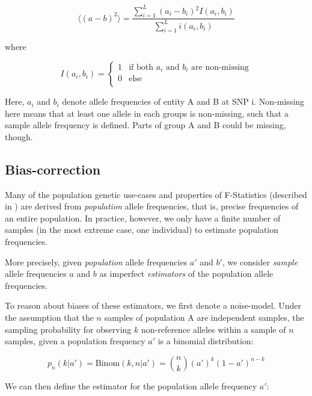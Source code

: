 \documentclass{article}
\begin{document}
\begin{equation}
\langle(a-b)^2\rangle=\frac{\sum _{i=1}^L \left(a_i-b_i\right){}^2 I\left(a_i,b_i\right)}{\sum _{i=1}^L i\left(a_i,b_i\right)}
\end{equation}

where

\begin{equation}
I\left(a_i,b_i\right)=
\begin{cases}
    1 & \text{if both $a_i$ and $b_i$ are non-missing} \\
    0 & \text{else} \\
\end{cases}
\end{equation}

Here, \(a_i\) and \(b_i\) denote allele frequencies of entity A and B at SNP i. Non-missing here means that at least one allele in each groups is non-missing, such that a sample allele frequency is defined. Parts of group A and B could be missing, though.

\subsection{Bias-correction}

Many of the population genetic use-cases and properties of F-Statistics (described in \cite{Patterson2012-yq}) are derived from \textit{population} allele frequencies, that is, precise frequencies of an entire population. In practice, however, we only have a finite number of samples (in the most extreme case, one individual) to estimate population frequencies. 

More precisely, given \textit{ population }allele frequencies \(a'\) and \(b'\), we consider \textit{ sample }allele frequencies \(a\) and \(b\)
as imperfect \textit{ estimators }of the population allele frequencies. 

To reason about biases of these estimators, we first denote a noise-model. Under the assumption that the \(n\) samples of population A are independent samples, the sampling probability for observing \(k\) non-reference alleles within a sample of \(n\) samples, given a population frequency \(a'\) is a binomial distribution:

\begin{equation}
p_n(k|a')=\text{Binom}(k,n|a')=\binom{n}{k}\left(a'\right)^k(1-a')^{n-k}
\end{equation}

We can then define the estimator for the population allele frequency \(a'\):
\end{document}
